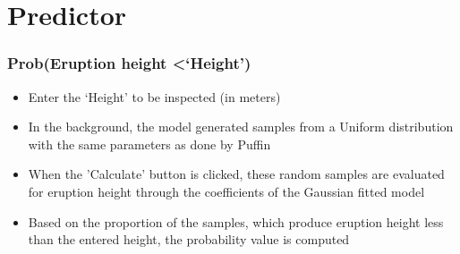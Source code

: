 \documentclass[10pt]{beamer}
\begin{document}
\section{Predictor}
\begin{frame}
\frametitle{Prob(Eruption height \textless `Height')}

\begin{itemize}
    \item Enter the `Height' to be inspected (in meters)
    \item In the background, the model generated samples from a Uniform distribution with the same parameters as done by Puffin
    \item When the 'Calculate' button is clicked, these random samples are evaluated for eruption height through the coefficients of the Gaussian fitted model
    \item Based on the proportion of the samples, which produce eruption height less than the entered height, the probability value is computed
\end{itemize}

\end{frame}






\begin{frame}
\Large
\begin{center}
\end{center}
\end{frame}
\end{document}
